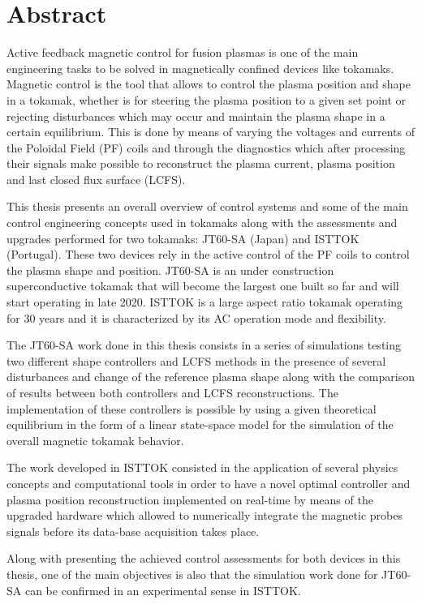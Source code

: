 \chapter*{Abstract}
Active feedback magnetic control for fusion plasmas is one of the main engineering tasks to be solved in magnetically  confined devices like tokamaks. Magnetic control is the tool that allows to control the plasma position and shape in a tokamak, whether is for steering the plasma position to a given set point or rejecting disturbances which may occur and maintain the plasma shape in a certain equilibrium. This is done by means of varying the voltages and currents of the  Poloidal Field (PF) coils and through the diagnostics which after processing their signals make possible to reconstruct the plasma current, plasma position and last closed flux surface (LCFS).
\smallskip

This thesis presents an overall overview of control systems and some of the main control engineering concepts used in tokamaks along with  the assessments and upgrades performed for two tokamaks: JT60-SA (Japan) and ISTTOK (Portugal). These two devices rely in the active control of the PF coils to control the plasma shape and position. JT60-SA is an under construction superconductive tokamak that will become the largest one built so far and will start operating in late 2020. ISTTOK is a large aspect ratio tokamak operating for 30 years and it is characterized by its AC operation mode and flexibility. \smallskip

The JT60-SA work done in this thesis consists in a series of simulations testing two different shape controllers and LCFS methods in the presence of several disturbances and change of the reference plasma shape along with the comparison of results between both controllers and LCFS reconstructions. The implementation of these controllers is possible by using a given theoretical equilibrium in the form of a linear state-space model for the simulation of the overall magnetic  tokamak behavior.\smallskip

 The work developed in ISTTOK consisted in the application of several physics concepts and computational tools in order to have a novel optimal controller and plasma position reconstruction implemented on real-time by means of the upgraded hardware which allowed to numerically integrate the magnetic probes signals before its data-base acquisition takes place. \smallskip
 
 Along with presenting the achieved control assessments for both devices in this thesis, one of the main objectives  is also that the simulation work done for JT60-SA can be confirmed in an experimental sense in ISTTOK. \smallskip


